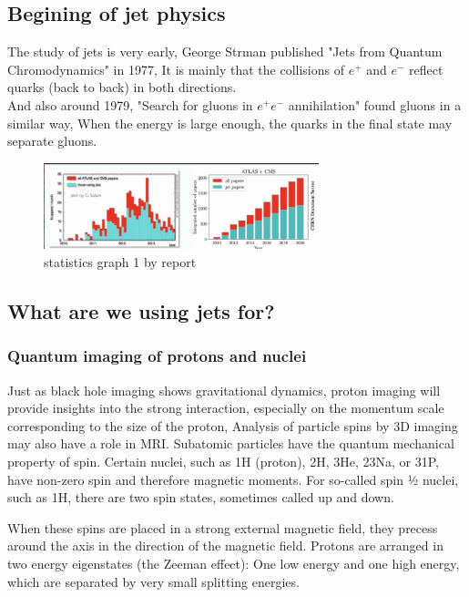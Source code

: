 \documentclass[12pt, a4paper, oneside]{article}
\begin{document}
\begin{spacing}{2.0}
\section{Begining of jet physics}
The study of jets is very early, George Strman published "Jets from Quantum Chromodynamics"\cite{PhysRevLett.39.1436} in 1977,
It is mainly that the collisions of $e^+$ and $e^-$ reflect quarks (back to back) in both directions. \\
And also around 1979, "Search for gluons in $e^+e^-$ annihilation"\cite{ELLIS1976253} found gluons in a similar way,
When the energy is large enough, the quarks in the final state may separate gluons.

\begin{figure}[htbp]
\centering
\includegraphics[width=8cm]{sigma.jpg}
\caption{statistics graph 1 by report}
\end{figure}
\subsection{What are we using jets for?}
\subsubsection{Quantum imaging of protons and nuclei}
Just as black hole imaging shows gravitational dynamics, proton imaging will provide insights into the strong interaction, especially on the momentum scale corresponding to the size of the proton,
Analysis of particle spins by 3D imaging may also have a role in MRI.
Subatomic particles have the quantum mechanical property of spin. Certain nuclei, such as 1H (proton), 2H, 3He, 23Na, or 31P, have non-zero spin and therefore magnetic moments.
For so-called spin 1⁄2 nuclei, such as 1H, there are two spin states, sometimes called up and down.

When these spins are placed in a strong external magnetic field, they precess around the axis in the direction of the magnetic field. Protons are arranged in two energy eigenstates (the Zeeman effect):
One low energy and one high energy, which are separated by very small splitting energies.

\end{spacing}
\end{document}
